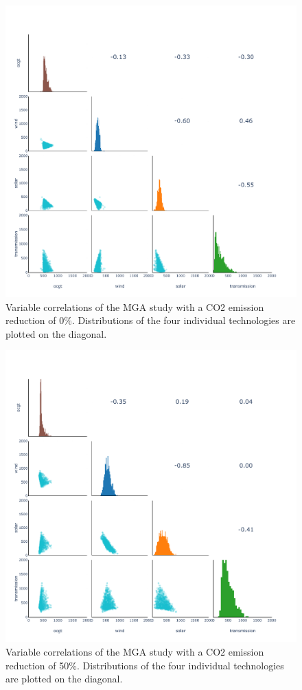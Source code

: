\begin{figure}[p]\center
	\includegraphics[width=1.2\textwidth,trim={0 0cm 0 0cm},clip]{./Images/corelation_4D_00}
	\caption{Variable correlations of the MGA study with a CO2 emission reduction of 0\%. Distributions of the four individual technologies are plotted on the diagonal.}

\end{figure}

\begin{figure}[p]\center
	\includegraphics[width=1.2\textwidth,trim={0 0cm 0 0cm},clip]{./Images/corelation_4D_50}
	\caption{Variable correlations of the MGA study with a CO2 emission reduction of 50\%. Distributions of the four individual technologies are plotted on the diagonal.}

\end{figure}

